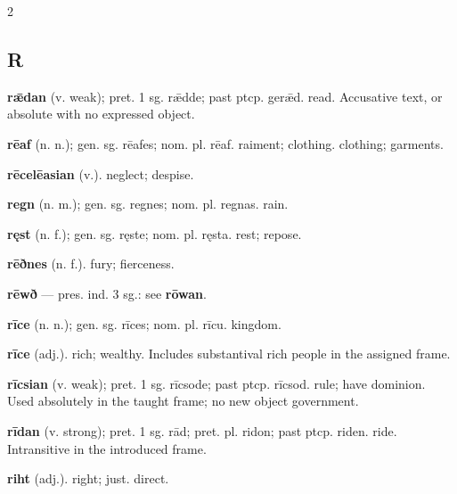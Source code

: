 \begin{multicols*}{2}
\subsection*{R}
\textbf{rǣdan} (v. weak); pret. 1 sg. rǣdde; past ptcp. gerǣd. read. Accusative text, or absolute with no expressed object.\par
\textbf{rēaf} (n. n.); gen. sg. rēafes; nom. pl. rēaf. raiment; clothing. clothing; garments.\par
\textbf{rēcelēasian} (v.). neglect; despise.\par
\textbf{regn} (n. m.); gen. sg. regnes; nom. pl. regnas. rain.\par
\textbf{ręst} (n. f.); gen. sg. ręste; nom. pl. ręsta. rest; repose.\par
\textbf{rēðnes} (n. f.). fury; fierceness.\par
\textbf{rēwð} — pres. ind. 3 sg.: see \textbf{rōwan}.\par
\textbf{rīce} (n. n.); gen. sg. rīces; nom. pl. rīcu. kingdom.\par
\textbf{rīce} (adj.). rich; wealthy. Includes substantival rich people in the assigned frame.\par
\textbf{rīcsian} (v. weak); pret. 1 sg. rīcsode; past ptcp. rīcsod. rule; have dominion. Used absolutely in the taught frame; no new object government.\par
\textbf{rīdan} (v. strong); pret. 1 sg. rād; pret. pl. ridon; past ptcp. riden. ride. Intransitive in the introduced frame.\par
\textbf{riht} (adj.). right; just. direct.\par

\end{multicols*}
